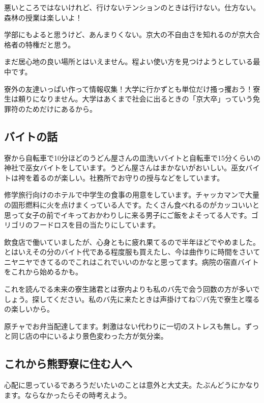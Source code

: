 \begin{multicols}{2}
  悪いところではないけれど、行けないテンションのときは行けない。仕方ない。森林の授業は楽しいよ！

  学部にもよると思うけど、あんまりくない。京大の不自由さを知れるのが京大合格者の特権だと思う。

  まだ居心地の良い場所とはいえません。程よい使い方を見つけようとしている最中です。

  寮外の友達いっぱい作って情報収集！大学に行かずとも単位だけ搔っ攫おう！寮生は頼りになりません。大学はあくまで社会に出るときの「京大卒」っていう免罪符のためだけにあるから。



  \subsection{バイトの話}

  寮から自転車で10分ほどのうどん屋さんの皿洗いバイトと自転車で15分くらいの神社で巫女バイトをしています。うどん屋さんはまかないがおいしい。巫女バイトは袴を着るのが楽しい。社務所でお守りの授与などをしています。

  修学旅行向けのホテルで中学生の食事の用意をしています。チャッカマンで大量の固形燃料に火を点けまくっている人です。たくさん食べれるのがカッコいいと思って女子の前でイキっておかわりしに来る男子にご飯をよそってる人です。ゴリゴリのフードロスを目の当たりにしています。

  飲食店で働いていましたが、心身ともに疲れ果てるので半年ほどでやめました。とはいえその分のバイト代である程度服も買えたし、今は曲作りに時間をさいてニヤニヤできてるのでこれはこれでいいのかなと思ってます。病院の宿直バイトをこれから始めるかも。

  これを読んでる未来の寮生諸君とは寮内よりも私のバ先で会う回数の方が多いでしょう。探してください。私のバ先に来たときは声掛けてね♡バ先で寮生と喋るの楽しいから。

  原チャでお弁当配達してます。刺激はない代わりに一切のストレスも無し。ずっと同じ店の中にいるより景色変わった方が気分楽。



  \subsection{これから熊野寮に住む人へ}

  心配に思っているであろうだいたいのことは意外と大丈夫。たぶんどうにかなります。ならなかったらその時考えよう。


\end{multicols}
